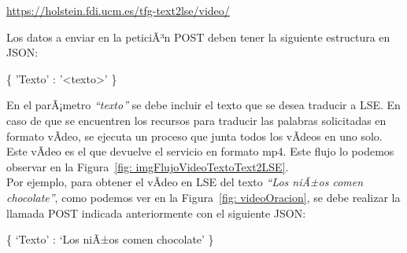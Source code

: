 \begin{shaded}
	\url{https://holstein.fdi.ucm.es/tfg-text2lse/video/  }	
\end{shaded}


Los datos a enviar en la peticiÃ³n POST deben tener la siguiente estructura en JSON: 
\begin{center}

		\{ 'Texto' : '<texto>' \}

\end{center}


En el parÃ¡metro \textit{``texto''} se debe incluir el texto que se desea traducir a LSE. En caso de que se encuentren los recursos para traducir las palabras solicitadas en formato vÃ­deo, se ejecuta un proceso que junta todos los vÃ­deos en uno solo. Este vÃ­deo es el que devuelve el servicio en formato mp4. Este flujo lo podemos observar en la Figura~\ref {fig: imgFlujoVideoTextoText2LSE}.\\

Por ejemplo, para obtener el vÃ­deo en LSE del texto \textit{``Los niÃ±os comen chocolate''}, como podemos ver en la Figura~\ref {fig: videoOracion}, se debe realizar la llamada POST indicada anteriormente con el siguiente JSON:

\begin{center}
	
	\{ `Texto' : `Los niÃ±os comen chocolate' \}
	
\end{center}


